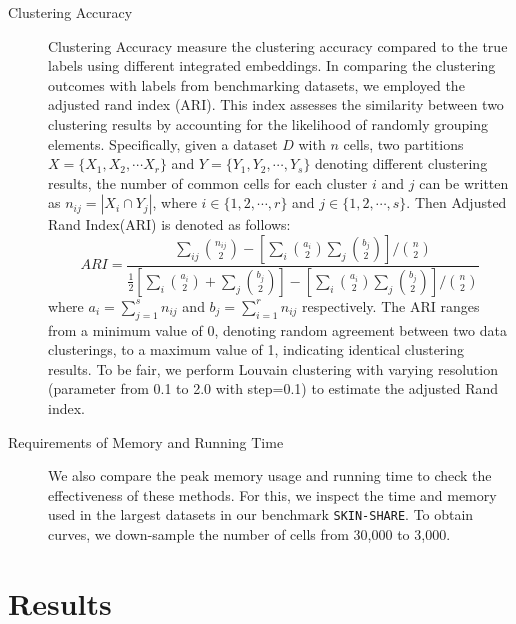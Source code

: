 \begin{description}
	\item[Clustering Accuracy] Clustering Accuracy measure the clustering accuracy compared to the true labels using different integrated embeddings. In comparing the clustering outcomes with labels from benchmarking datasets, we employed the adjusted rand index (ARI)\citep{hubert1985ARI}. This index assesses the similarity between two clustering results by accounting for the likelihood of randomly grouping elements. Specifically, given a dataset $D$ with $n$ cells, two partitions $ X = \{ X_{1}, X_{2}, \cdots X_{r} \} $ and $ Y = \{ Y_{1}, Y_{2}, \cdots, Y_{s} \} $ denoting different clustering results, the number of common cells for each cluster $i$ and $j$ can be written as $n_{ij} = | X_{i} \cap Y_{j} |$, where $ i \in \{1, 2, \cdots, r \} $ and $ j \in \{1, 2, \cdots, s \} $. Then Adjusted Rand Index(ARI) is denoted as follows:
	\begin{equation}
		ARI = \frac{\sum_{ij} {n_{ij} \choose 2} - [ \sum_{i} {a_{i} \choose 2} \sum_{j} {b_{j} \choose 2 } ] / {n \choose 2}}{\frac{1}{2} [\sum_{i} {a_{i} \choose 2 } + \sum_{j} {b_{j} \choose 2}] - [\sum_{i} {a_{i} \choose 2} \sum_{j} {b_{j} \choose 2 } ] / {n \choose 2} }
	\end{equation}
	where $ a_{i} = \sum_{j=1}^{s} n_{ij} $ and $ b_{j} = \sum_{i=1}^{r} n_{ij} $ respectively. The ARI ranges from a minimum value of 0, denoting random agreement between two data clusterings, to a maximum value of 1, indicating identical clustering results.  To be fair, we perform Louvain clustering with varying resolution (parameter from 0.1 to 2.0 with step=0.1) to estimate the adjusted Rand index. 
	\item[Requirements of Memory and Running Time] We also compare the peak memory usage and running time to check the effectiveness of these methods. For this, we inspect the time and memory used in the largest datasets in our benchmark \texttt{SKIN-SHARE}. To obtain curves, we down-sample the number of cells from 30,000 to 3,000.
\end{description}




\section{Results}
\label{MOJITOO:out}

